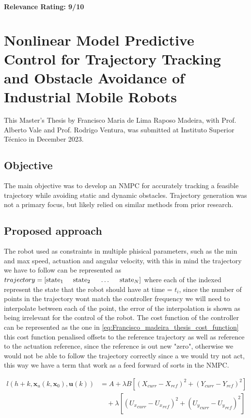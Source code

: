 \documentclass[a4paper,12pt]{article}
\begin{document}
\textbf{Relevance Rating: 9/10}

\section{Nonlinear Model Predictive Control for Trajectory Tracking and Obstacle Avoidance of Industrial Mobile Robots}\label{sec:Francisco_Madeira_Thesis_NMPC_for_reference_tracking_in_industrial_mobile_robots}
This Master's Thesis by Francisco Maria de Lima Raposo Madeira, with Prof.
Alberto Vale and Prof. Rodrigo Ventura, was submitted at Instituto Superior
Técnico in December 2023.

\subsection{Objective}
The main objective was to develop an NMPC for accurately tracking a feasible
trajectory while avoiding static and dynamic obstacles. Trajectory generation
was not a primary focus, but likely relied on similar methods from prior
research.

\subsection{Proposed approach}
	The robot used as constraints in multiple phisical parameters, such as the min and max speed, actuation and angular velocity, with this in mind the trajectory we have to follow can be represented as $trajectory =  \left[\text{state}_{1} \hspace{0.5cm} \text{state}_{2}  \hspace{0.5cm} \dots \hspace{0.5cm} \text{state}_{N} \right]$ where each of the indexed represent the state that the robot should have at time = $t_{i}$, since the number of points in the trajectory wont match the controller frequency we will need to interpolate between each of the point, the error of the interpolation is shown as being irrelevant for the control of the robot. The cost function of the controller can be represented as the one in \ref{eq:Francisco_madeira_thesis_cost_function} this cost function penalised offsets to the reference trajectory as well as reference to the actuation reference, since the reference is out new "zero", otherwise we would not be able to follow the trajectory correctly since a we would try not act, this way we have a term that work as a feed forward of sorts in the NMPC.

	\begin{align}
		l(h + k, \textbf{x}_{u}(k, \textbf{x}_{0}), \textbf{u}(k)) &= A + \lambda B \left[
			\left( X_{curr} - X_{ref} \right)^2 + \left( Y_{curr} - Y_{ref} \right)^2  \right] \nonumber \\
		&\quad + \lambda \left[ \left( {U_{x}}_{curr} - {U_{x}}_{ref} \right)^2 + \left( {U_{y}}_{curr} - {U_{y}}_{ref} \right)^2 
		\right]
		\label{eq:Francisco_madeira_thesis_cost_function}
	\end{align}
\end{document}
